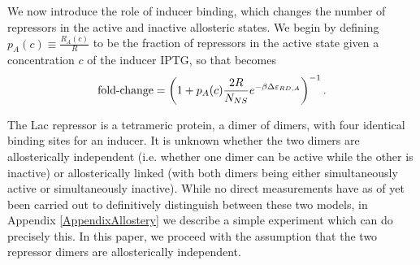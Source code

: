We now introduce the role of inducer binding, which changes the number of
repressors in the active and inactive allosteric states. We begin by defining
\(p_A(c) \equiv \frac{R_A(c)}{R}\) to be the fraction of repressors in the
active state given a concentration \(c\) of the inducer IPTG, so that %
\eref[eq4] becomes
\begin{equation}
\operatorname{fold-change} = \left( 1+p_A(c) \frac{2 R}{N_{NS}}e^{-\beta
	\Delta\varepsilon_{RD,A}} \right)^{-1}. \label{eq5}
\end{equation}

The Lac repressor is a tetrameric protein, a dimer of dimers, with four
identical binding sites for an inducer. It is unknown whether the two dimers are
allosterically independent (i.e. whether one dimer can be active while the other
is inactive) or allosterically linked (with both dimers being either
simultaneously active or simultaneously inactive). While no direct measurements
have as of yet been carried out to definitively distinguish between these two
models, in Appendix \ref{AppendixAllostery} we describe a simple experiment
which can do precisely this. In this paper, we proceed with the assumption that
the two repressor dimers are allosterically independent. 

